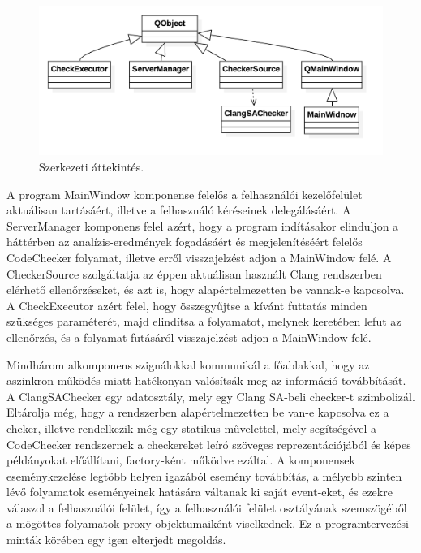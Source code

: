 \documentclass[a4paper,12pt]{report}
\begin{document}
\begin{figure}[h]
\caption{Szerkezeti áttekintés.}
\centering
\includegraphics[scale=0.3]{UMLattekintes.png}
\end{figure}

A program MainWindow komponense felelős a felhasználói kezelőfelület aktuálisan tartásáért, illetve a felhasználó kéréseinek delegálásáért. A ServerManager komponens felel azért, hogy a program indításakor elinduljon a háttérben az analízis-eredmények fogadásáért és megjelenítéséért felelős CodeChecker folyamat, illetve erről visszajelzést adjon a MainWindow felé. A CheckerSource szolgáltatja az éppen aktuálisan használt Clang rendszerben elérhető ellenőrzéseket, és azt is, hogy alapértelmezetten be vannak-e kapcsolva. A CheckExecutor azért felel, hogy összegyűjtse a kívánt futtatás minden szükséges paraméterét, majd elindítsa a folyamatot, melynek keretében lefut az ellenőrzés, és a folyamat futásáról visszajelzést adjon a MainWindow felé.

Mindhárom alkomponens szignálokkal kommunikál a főablakkal, hogy az aszinkron működés miatt hatékonyan valósítsák meg az információ továbbítását. A ClangSAChecker egy adatosztály, mely egy Clang SA-beli checker-t szimbolizál. Eltárolja még, hogy a rendszerben alapértelmezetten be van-e kapcsolva ez a cheker, illetve rendelkezik még egy statikus művelettel, mely segítségével a  CodeChecker rendszernek a checkereket leíró szöveges reprezentációjából és képes példányokat előállítani, factory-ként működve ezáltal. A komponensek eseménykezelése legtöbb helyen igazából esemény továbbítás, a mélyebb szinten lévő folyamatok eseményeinek hatására váltanak ki saját event-eket, és ezekre válaszol a felhasználói felület, így a felhasználói felület osztályának szemszögéből a mögöttes folyamatok proxy-objektumaiként viselkednek. Ez a programtervezési minták körében egy igen elterjedt megoldás.
\end{document}
